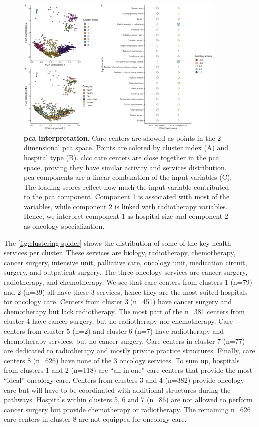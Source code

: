 \begin{figure}[H]
    \includegraphics[width=0.9\textwidth]{images/camion/supplemental/sup_fig1_pca_and_clustering.png}
    \centering
    \caption{ \textbf{\ac{pca} interpretation}. Care centers are showed as
        points in the 2-dimensional \ac{pca} space. Points are colored by
        cluster index (A) and hospital type (B). \ac{clcc} care centers are
        close together in the \ac{pca} space, proving they have similar activity
        and services distribution. \ac{pca} components are a linear combination
        of the input variables (C). The loading scores reflect how much the
        input variable contributed to the \ac{pca} component. Component 1 is
        associated with most of the variables, while component 2 is linked with
        radiotherapy variables. Hence, we interpret component 1 as hospital size
        and component 2 as oncology specialization. }
    \label{fig:clustering-pca}
\end{figure}

The \cref{fig:clustering-spider} shows the distribution of some of the key
health services per cluster. These services are biology, radiotherapy,
chemotherapy, cancer surgery, intensive unit, palliative care, oncology unit,
medication circuit, surgery, and outpatient surgery. The three oncology services
are cancer surgery, radiotherapy, and chemotherapy. We see that care centers
from clusters 1 (n=79) and 2 (n=39) all have these 3 services, hence they are
the most suited hospitals for oncology care. Centers from cluster 3 (n=451) have
cancer surgery and chemotherapy but lack radiotherapy. The most part of the
n=381 centers from cluster 4 have cancer surgery, but no radiotherapy nor
chemotherapy. Care centers from cluster 5 (n=2) and cluster 6 (n=7) have
radiotherapy and chemotherapy services, but no cancer surgery. Care centers in
cluster 7 (n=77) are dedicated to radiotherapy and mostly private practice
structures. Finally, care centers 8 (n=626) have none of the 3 oncology
services. To sum up, hospitals from clusters 1 and 2 (n=118) are “all-in-one”
care centers that provide the most “ideal” oncology care. Centers from clusters
3 and 4 (n=382) provide oncology care but will have to be coordinated with
additional structures during the pathways. Hospitals within clusters 5, 6 and 7
(n=86) are not allowed to perform cancer surgery but provide chemotherapy or
radiotherapy. The remaining n=626 care centers in cluster 8 are not equipped for
oncology care.

